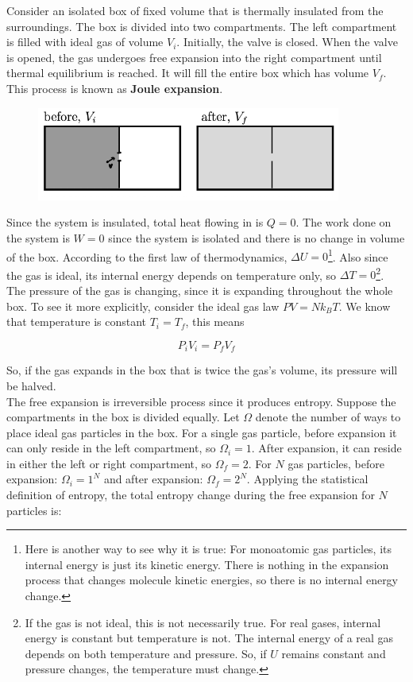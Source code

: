 Consider an isolated box of fixed volume that is thermally insulated from the surroundings. The box is divided into two compartments. The left compartment is filled with ideal gas of volume $V_i$. Initially, the valve is closed. When the valve is opened, the gas undergoes free expansion into the right compartment until thermal equilibrium is reached. It will fill the entire box which has volume $V_f$. This process is known as \textbf{Joule expansion}.

\begin{figure}[H]
	\centering
	\includegraphics[width=100mm]{31.png}
\end{figure}

Since the system is insulated, total heat flowing in is $Q=0$. The work done on the system is $W=0$ since the system is isolated and there is no change in volume of the box. According to the first law of thermodynamics, $\Delta U=0$\footnote{Here is another way to see why it is true: For monoatomic gas particles, its internal energy is just its kinetic energy. There is nothing in the expansion process that changes molecule kinetic energies, so there is no internal energy change.}. Also since the gas is ideal, its internal energy depends on temperature only, so $\Delta T=0$\footnote{If the gas is not ideal, this is not necessarily true. For real gases, internal energy is constant but temperature is not. The internal energy of a real gas depends on both temperature and pressure. So, if $U$ remains constant and pressure changes, the temperature must change.}. \\

The pressure of the gas is changing, since it is expanding throughout the whole box. To see it more explicitly, consider the ideal gas law $PV=Nk_BT$. We know that temperature is constant $T_i=T_f$, this means

\[P_iV_i=P_fV_f\]

So, if the gas expands in the box that is twice the gas's volume, its pressure will be halved. \\

The free expansion is irreversible process since it produces entropy. Suppose the compartments in the box is divided equally. Let $\Omega$ denote the number of ways to place ideal gas particles in the box. For a single gas particle, before expansion it can only reside in the left compartment, so $\Omega_i=1$. After expansion, it can reside in either the left or right compartment, so $\Omega_f=2$. For $N$ gas particles, before expansion: $\Omega_i=1^N$ and after expansion: $\Omega_f=2^N$. Applying the statistical definition of entropy, the total entropy change during the free expansion for $N$ particles is:

